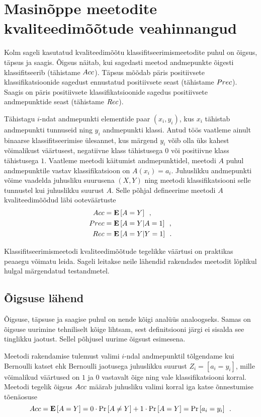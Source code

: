 \section{Masinõppe meetodite kvaliteedimõõtude veahinnangud}
\label{section:kvaliteedimõõtude veahinnangud}
Kolm sageli kasutatud kvaliteedimõõtu klassifitseerimismeetodite puhul on õigsus, täpsus ja saagis. Õigsus näitab, kui sagedasti meetod andmepunkte õigesti klassifitseerib (tähistame $Acc$). Täpsus mõõdab päris positiivsete klassifikatsioonide sagedust ennustatud positiivsete seast (tähistame $Prec$). Saagis on päris positiivsete klassifikatsioonide sagedus positiivsete andmepunktide seast (tähistame $Rec$).

Tähistagu $i$-ndat andmepunkti elementide paar $(x_i, y_i)$, kus $x_i$ tähistab andmepunkti tunnuseid ning $y_i$ andmepunkti klassi. Antud töös vaatleme ainult binaarse klassifitseerimise ülesannet, kus märgend $y_i$ võib olla üks kahest võimalikust väärtusest, negatiivne klass tähistusega $0$ või positiivne klass tähistusega $1$. Vaatleme meetodi käitumist andmepunktidel, meetodi $A$ puhul andmepunktile vastav klassifikatsioon on $A(x_i) = a_i$. Juhuslikku andmepunkti võime vaadelda juhusliku suurusena $(X, Y)$ ning meetodi klassifikatsiooni selle tunnustel  kui juhuslikku suurust $A$. Selle põhjal defineerime meetodi $A$ kvaliteedimõõdud läbi ooteväärtuste
\begin{align}
    Acc &= \operatorname*{\mathbf{E}}\left[A = Y\right] \enspace, \label{eq:õigsus}\\
    Prec &= \operatorname*{\mathbf{E}}\left[A = Y | A = 1\right] \enspace, \label{eq:täpsus}\\
    Rec &= \operatorname*{\mathbf{E}}\left[A = Y | Y = 1\right] \enspace. \label{eq:saagis}
\end{align}

Klassifitseerimismeetodi kvaliteedimõõtude tegelikke väärtusi on praktikas peaaegu võimatu leida. Sageli leitakse neile lähendid rakendades meetodit lõplikul hulgal märgendatud testandmetel.

\subsection{Õigsuse lähend}
Õigsuse, täpsuse ja saagise puhul on nende kõigi analüüs analoogseks. Samas on õigsuse uurimine tehniliselt kõige lihtsam, sest definitsiooni järgi ei sisalda see tinglikku jaotust. Sellel põhjusel uurime õigsust esimesena.
 
Meetodi rakendamise tulemust valimi $i$-ndal andmepunktil tõlgendame kui Bernoulli katset ehk Bernoulli jaotusega juhuslikku suurust $Z_i = [a_i = y_i]$, mille võimalikud väärtused on $1$ ja $0$ vastavalt õige ning vale klassifikatsiooni korral. Meetodi tegelik õigsus $Acc$ määrab juhusliku valimi korral iga katse õnnestumise tõenäosuse
\begin{equation*}
    Acc = \operatorname*{\mathbf{E}}\left[A = Y\right] = 0 \cdot \Pr\left[A \neq Y\right] + 1 \cdot \Pr\left[A = Y\right] = \Pr\left[a_i = y_i\right] \enspace.
\end{equation*}

